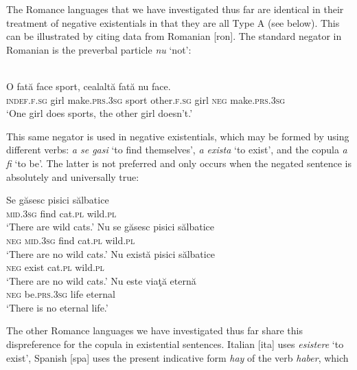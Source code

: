 ﻿\documentclass[output=paper]{langsci/langscibook}
\begin{document}
The Romance languages that we have investigated thus far are identical in
their treatment of negative existentials in that they are all Type A (see
 below). This can be illustrated by citing
data from Romanian [ron]. The standard negator in Romanian is the preverbal particle \textit{nu} `not':
%
\begin{exe}\ex
{}\\
    \gll O fată  face sport, cealaltă fată nu face.  \\
\textsc{indef.f.sg}   girl  make.\textsc{prs.3sg} sport other.\textsc{f.sg}
girl \textsc{neg}  make.\textsc{prs.3sg} \\
    \glt `One girl does sports, the other girl doesn't.'
    \end{exe}
%
This same negator is used in negative existentials, which may be formed by
using different verbs: \textit{a se gasi} `to find
themselves', \textit{a exista} `to exist', and the copula
\textit{a fi} `to be'. The latter is not preferred and only occurs
when the negated sentence is absolutely and universally true:
%
\begin{exe}\ex
{}
\begin{xlist}
\ex
    \gll Se găsesc  pisici  sălbatice   \\
\textsc{mid.3sg}  find       cat.\textsc{pl}  wild.\textsc{pl} \\
    \glt `There are wild cats.'
\ex
    \gll Nu se găsesc  pisici  sălbatice \\
    \textsc{neg} \textsc{mid.3sg} find cat.\textsc{pl} wild.\textsc{pl}\\
    \glt `There are no wild cats.'
\ex
    \gll Nu      există   pisici  sălbatice \\
    \textsc{neg}  exist      cat.\textsc{pl}  wild.\textsc{pl}\\
    \glt `There are no wild cats.'
\ex
    \gll Nu   este viaţă eternă\\
    \textsc{neg}  be.\textsc{prs.3sg}  life    eternal\\
\glt `There is no eternal life.'
    \end{xlist}\end{exe}
%
The other Romance languages we have investigated thus far share this
dispreference for the copula in existential sentences. Italian
[ita] uses \textit{esistere} `to exist', Spanish [spa] uses the
present indicative form \textit{hay} of the verb \textit{haber}, which
\end{document}
